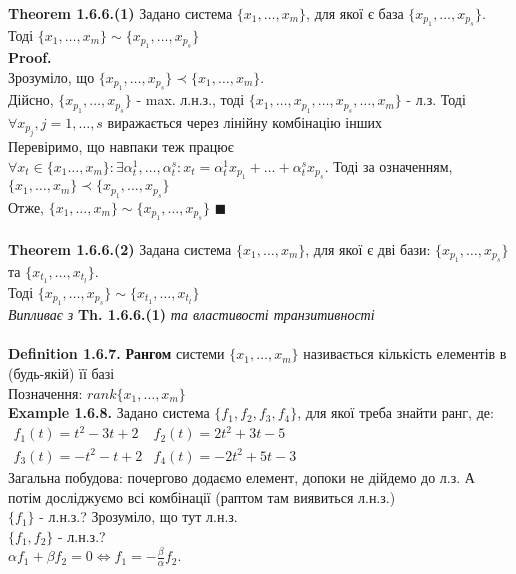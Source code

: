 \documentclass[a4paper, 14pt]{extarticle}
\def\huge{\displaystyle}
\def\defin#1{\textbf{Definition {#1}}}
\def\ex#1{\textbf{Example {#1}}}
\def\th#1{\textbf{Theorem {#1}}}
\def\proof{\textbf{Proof.}\\}
\def\bigline{\vspace{5mm}\\}
\def\qed{$\blacksquare$}
\begin{document}
	\\
	\th{1.6.6.(1)} Задано система $\{x_1, \dots, x_m\}$, для якої є база $\{x_{p_1}, \dots, x_{p_s}\}$. Тоді $\{x_1, \dots, x_m\} \sim \{x_{p_1}, \dots, x_{p_s}\}$\\
	\proof
	Зрозуміло, що $\{x_{p_1}, \dots, x_{p_s} \} \prec \{x_1, \dots, x_m \}$.\\
	Дійсно, $\{x_{p_1}, \dots, x_{p_s}\}$ - max. л.н.з., тоді $\{x_1,\dots,x_{p_1},\dots,x_{p_s},\dots,x_m\}$ - л.з. Тоді $\forall x_{p_j}, j=1,\dots,s$ виражається через лінійну комбінацію інших\\
	Перевіримо, що навпаки теж працює\\
	$\forall x_t \in \{x_1 \dots, x_m\}: \exists \alpha^1_t, \dots, \alpha^s_t: x_t = \alpha^1_t x_{p_1} + \dots + \alpha^s_t x_{p_s}$. Тоді за означенням, $\{x_1, \dots, x_m \} \prec \{x_{p_1}, \dots, x_{p_s} \}$\\
	Отже, $\{x_1, \dots, x_m \} \sim \{x_{p_1}, \dots, x_{p_s} \}$ \qed
	\\
	\\
	\th{1.6.6.(2)} Задана система $\{x_1, \dots, x_m\}$, для якої є дві бази: $\{x_{p_1}, \dots, x_{p_s}\}$ та $\{x_{t_1}, \dots, x_{t_l}\}$. \\ Тоді
	$\{x_{p_1}, \dots, x_{p_s}\} \sim \{x_{t_1}, \dots, x_{t_l}\}$\\
	\textit{Випливає з} \textbf{Th. 1.6.6.(1)} \textit{та властивості транзитивності}
	\\
	\\
	\defin{1.6.7.} \textbf{Рангом} системи $\{x_1, \dots, x_m\}$ називається кількість елементів в (будь-якій) її базі\\
	Позначення: $rank\{x_1, \dots, x_m\}$
	\bigline
	\ex{1.6.8.} Задано система $\{f_1, f_2, f_3, f_4\}$, для якої треба знайти ранг, де:\\
	$\begin{matrix}
	f_1(t) = t^2-3t+2 & f_2(t) = 2t^2+3t-5 \\
	f_3(t) = -t^2-t+2 & f_4(t) = -2t^2+5t-3
	\end{matrix}
	$\\
	Загальна побудова: почергово додаємо елемент, допоки не дійдемо до л.з. А потім досліджуємо всі комбінації (раптом там виявиться л.н.з.)\\
	$\{f_1\}$ - л.н.з.? Зрозуміло, що тут л.н.з.\\
	$\{f_1, f_2 \}$ - л.н.з.? \\ $\alpha f_1 + \beta f_2 = 0 \iff \huge f_1 = -\frac{\beta}{\alpha}f_2$. \\
\end{document}
